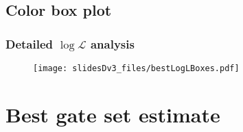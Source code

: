 \documentclass{beamer}
\begin{document}
{\subsection{Color box plot}
\begin{frame}
\frametitle{Detailed $\log{\mathcal{L}}$ analysis}

\begin{figure}
\begin{center}
\texttt{[image: slidesDv3\_files/bestLogLBoxes.pdf]}
\end{center}
\end{figure}
\end{frame}

}{}

\section{Best gate set estimate}
\end{document}
